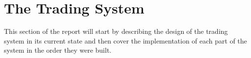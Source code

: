 \chapter{The Trading System}
	This section of the report will start by describing the design of the trading system in its current state and then cover the implementation of each part of the system in the order they were built.
	
	
	